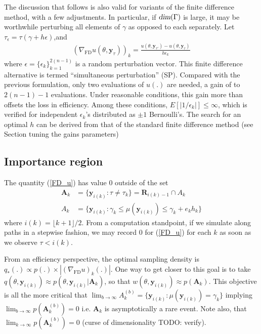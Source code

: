 \documentclass{article}
\begin{document}
The discussion that follows is also valid for variants of the finite
difference method, with a few adjustments. In particular, if
$\textsl{dim}(\Gamma)$ is large, it may be worthwhile perturbing all
elements of $\gamma$ as opposed to each separately. Let
$\tau_\epsilon=\tau(\gamma+h \epsilon)$,and
\begin{align}\label{FD_u_SP}
(\nabla_\mathrm{\scriptscriptstyle FD}
u(\theta,\mathbf{y}_{\tau}))_k
=\frac{u(\theta,\mathbf{y}_{\tau'})-u(\theta,\mathbf{y}_{\tau})}{h
\epsilon_k}
\end{align}where $\epsilon=\{\epsilon_k\}_{k=1}^{2(n-1)}$ is a random
perturbation vector. This finite difference alternative is termed
``simultaneous perturbation'' (SP). Compared with the previous
formulation, only two evaluations of $u(.)$ are needed, a gain of to
$2(n-1)-1$ evaluations. Under reasonable conditions, this gain more
than offsets the loss in efficiency. Among these conditions,
$E[|1/\epsilon_k|]\leq \infty$, which is verified for independent
$\epsilon_k$'s distributed as $\pm 1$ Bernoulli's. The search for an
optimal $h$ can be derived from that of the standard finite
difference method (see Section tuning the gains parameters)

\subsection{Importance region}
The quantity (\ref{FD_u}) has value $0$ outside of the set
\begin{align}
\label{region_A}
\mathbf{A}_k &= \{\mathbf{y}_{i(k)}: \tau \neq \tau_k\}=\mathbf{R}_{i(k)-1}\cap A_k\\
A_k &=\{\mathbf{y}_{i(k)}:\gamma_k\leq
\mu(\mathbf{y}_{i(k)})\leq\gamma_k+e_k h_k\}\end{align}where
$i(k)=\lfloor k+1\rfloor/2$.
From a computation standpoint, if we simulate along paths in a
stepwise fashion, we may record $0$ for (\ref{FD_u}) for each $k$ as
soon as we observe $\tau<i(k)$.

From an efficiency perspective, the optimal sampling density is
$q_*(.)\propto p(.) \times |(\nabla_{\mathrm{\scriptscriptstyle FD}}
u)_k(.)|$. One way to get closer to this goal is to take
$q(\theta,\mathbf{y}_{i(k)})\approx
p(\theta,\mathbf{y}_{i(k)}|\mathbf{A}_k)$, so that
$w(\theta,\mathbf{y}_{i(k)})\approx p(\mathbf{A}_k)$. This objective
is all the more critical that $\lim_{b\rightarrow\infty} A_k^{(b)} =
\{\mathbf{y}_{i(k)}:\mu(\mathbf{y}_{i(k)})=\gamma_k\}$ implying
$\lim_{b\rightarrow\infty}p(\mathbf{A}_k^{(b)})=0$ i.e.
$\mathbf{A}_k$ is asymptotically a rare event. Note also, that
$\lim_{k\rightarrow\infty}p(\mathbf{A}_k^{(b)})=0$ (curse of
dimensionality TODO: verify).
\end{document}
